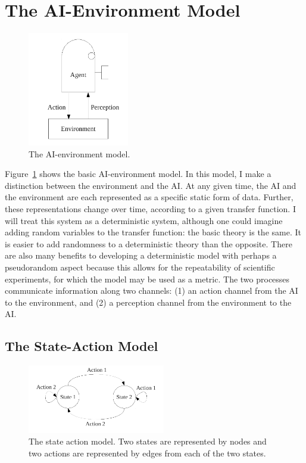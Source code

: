 \section{The AI-Environment Model}

\begin{figure}[bth]
  \center
  \includegraphics[height=5cm]{gfx/agent_environment}
  \caption[The AI-environment model]{The AI-environment model.}
  \label{fig:agent_environment}
\end{figure}

Figure~\ref{fig:agent_environment} shows the basic AI-environment
model.  In this model, I make a distinction between the environment
and the AI.  At any given time, the AI and the environment are
each represented as a specific static form of data.  Further, these
representations change over time, according to a given transfer
function.  I will treat this system as a deterministic system,
although one could imagine adding random variables to the transfer
function: the basic theory is the same.  It is easier to add
randomness to a deterministic theory than the opposite.  There are
also many benefits to developing a deterministic model with perhaps a
pseudorandom aspect because this allows for the repeatability of
scientific experiments, for which the model may be used as a metric.
The two processes communicate information along two channels: (1) an
action channel from the AI to the environment, and (2) a perception
channel from the environment to the AI.


\subsection{The State-Action Model}
\label{sec:state_action_model}

\begin{figure}[bth]
  \center
  \includegraphics[width=6cm]{gfx/state_action}
  \caption[The state-action model]{The state action model.  Two states
    are represented by nodes and two actions are represented by edges
    from each of the two states.}
  \label{fig:state_action}
\end{figure}

